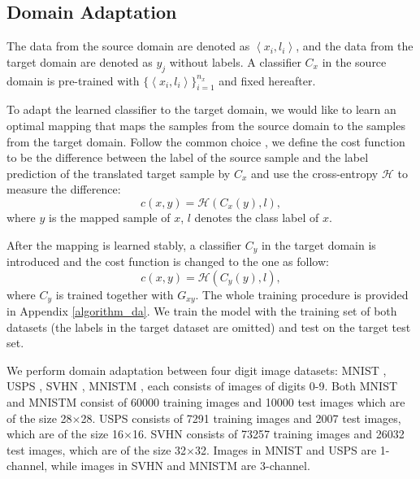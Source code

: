 \documentclass[runningheads]{llncs}
\begin{document}
\subsection{Domain Adaptation}
The data from the source domain are denoted as $\left<x_i, l_i\right>$, and the data from the target domain are denoted as $y_j$ without labels. 
A classifier $C_{x}$ in the source domain is pre-trained with $\{\left<x_i, l_i\right>\}_{i=1}^{n_x}$ and fixed hereafter.

To adapt the learned classifier to the target domain, we would like to learn an optimal mapping 
that maps the samples from the source domain to the samples from the target domain. Follow the common choice \cite{cycada,spot}, we define the cost function to be the difference between the label of the source sample and the label prediction of the translated target sample by $C_{x}$ and use the cross-entropy $\mathcal{H}$ to measure the difference: 
\begin{equation}
c(x, y) = \mathcal{H}(C_x(y), l), 
\end{equation}
where $y$ is the mapped sample of $x$, $l$ denotes the class label of $x$. 

After the mapping is learned stably, a classifier $C_y$ in the target domain is introduced and the cost function is changed to the one as follow:
\begin{equation}
c(x, y) = \mathcal{H}(C_y(y), l),
\end{equation}
where $C_{y}$ is trained together with $G_{xy}$. The whole training procedure is provided in Appendix \ref{algorithm_da}. 
We train the model with the training set of both datasets (the labels in the target dataset are omitted) and test on the target test set. 

We perform domain adaptation between four digit image datasets: MNIST \cite{mnist}, USPS \cite{usps}, SVHN \cite{svhn}, MNISTM \cite{mnistm}, each consists of images of digits 0-9.
Both MNIST and MNISTM consist of 60000 training images and 10000 test images which are of the size 28$\times$28.
USPS consists of 7291 training images and 2007 test images, which are of the size 16$\times$16. 
SVHN consists of 73257 training images and 26032 test images, which are of the size 32$\times$32. Images in MNIST and USPS are 1-channel, while images in SVHN and MNISTM are 3-channel. 
\end{document}
